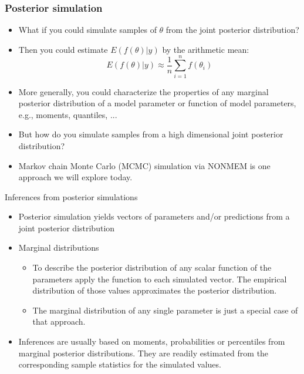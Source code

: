 \documentclass[handout]{beamer}
\begin{document}
\begin{frame}
  \frametitle{Posterior simulation}

  \begin{itemize}
  \item What if you could simulate samples of $\theta$ from the joint
    posterior distribution?
  \item Then you could estimate
    $E\left(f\left(\theta\right)|y\right)$ by the arithmetic mean:
$$E\left(f\left(\theta\right)|y\right) \approx \frac{1}{n}
\sum_{i=1}^n f\left(\theta_i\right)$$
\item More generally, you could characterize the properties of any
  marginal posterior distribution of a model parameter or function of
  model parameters, e.g., moments, quantiles, ...
\item But how do you simulate samples from a high dimensional joint
  posterior distribution?
\item Markov chain Monte Carlo (MCMC) simulation via NONMEM is one
  approach we will explore today.
\end{itemize}

\end{frame}

\begin{frame}{Inferences from posterior simulations}

  \begin{itemize}
  \item Posterior simulation yields vectors of parameters and/or
    predictions from a joint posterior distribution
  \item Marginal distributions
    \begin{itemize}
    \item To describe the posterior distribution of any scalar
      function of the parameters apply the function to each simulated
      vector. The empirical distribution of those values approximates
      the posterior distribution.
    \item The marginal distribution of any single parameter is just a
      special case of that approach.
    \end{itemize}
  \item Inferences are usually based on moments, probabilities or
    percentiles from marginal posterior distributions. They are
    readily estimated from the corresponding sample statistics for the
    simulated values.
  \end{itemize}

\end{frame}
\end{document}

